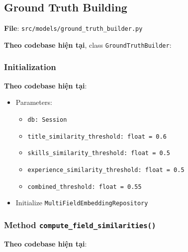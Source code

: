 \subsection{Ground Truth Building}

\textbf{File}: \texttt{src/models/ground\_truth\_builder.py}

\textbf{Theo codebase hiện tại}, class \texttt{GroundTruthBuilder}:

\subsubsection{Initialization}

\textbf{Theo codebase hiện tại}:

\begin{itemize}
    \item Parameters:
    \begin{itemize}
        \item \texttt{db: Session}
        \item \texttt{title\_similarity\_threshold: float = 0.6}
        \item \texttt{skills\_similarity\_threshold: float = 0.5}
        \item \texttt{experience\_similarity\_threshold: float = 0.5}
        \item \texttt{combined\_threshold: float = 0.55}
    \end{itemize}
    \item Initialize \texttt{MultiFieldEmbeddingRepository}
\end{itemize}

\subsubsection{Method \texttt{compute\_field\_similarities()}}

\textbf{Theo codebase hiện tại}:

